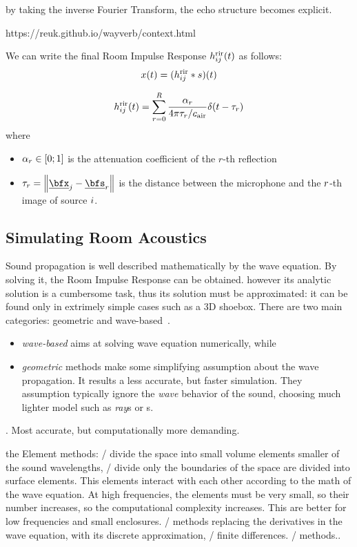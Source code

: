 by taking the inverse Fourier Transform, the echo structure becomes explicit.

https://reuk.github.io/wayverb/context.html

We can write the final Room Impulse Response $h^{\text{rir}}_{ij}(t)$ as follows:
\begin{equation}
    x(t) = (h^{\text{rir}}_{ij} \ast s)(t)
\end{equation}

\begin{equation}
    \rir_{ij}(t) = \sum_{r=0}^{R} \frac{\alpha_r}{4 \pi \tau_r / \cair} \delta \kparen{t - \tau_r}
\end{equation}
where
\begin{itemize}
    \item $\alpha_r \in \kintervcc{0}{1}$ is the attenuation coefficient of the $r$-th reflection
    \item $\tau_r = \norm{\positionMicrophone_\idxMic - \positionSource_\idxEch}$ is the distance between the microphone and the $r$-th image of source $i$.
\end{itemize}

\subsection{Simulating Room Acoustics}
Sound propagation is well described mathematically by the wave equation.
By solving it, the Room Impulse Response can be obtained.
however its analytic solution is a cumbersome task, thus its solution must be approximated: it can be found only in extrimely
simple cases such as a 3D shoebox.
There are two main categories: geometric and wave-based~\cite{Habets2010generator, reuk.github.io, Savioja2015goemetric}.
\begin{itemize}
    \item \textit{wave-based} aims at solving wave equation numerically, while
    \item \textit{geometric} methods make some simplifying assumption about the wave propagation. It results a less accurate, but faster simulation.
    They assumption typically ignore the \textit{wave} behavior of the sound, choosing much lighter model such as \textit{ray}s or s.
\end{itemize}

. Most accurate, but computationally more demanding.

the Element methods:
\FEMf/ divide the space into small volume elements smaller of the sound wavelengths,
\BEMf/ divide only the boundaries of the space are divided into surface elements.
This elements interact with each other according to the math of the wave equation.
At high frequencies, the elements must be very small, so their number increases, so the computational complexity increases.
This are better for low frequencies and small enclosures.
\FDTD/ methods replacing the derivatives in the wave equation, with its discrete approximation, \ie/ finite differences.
\DWM/ methods..

